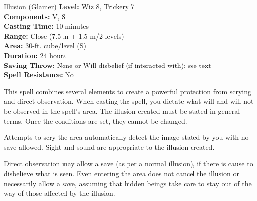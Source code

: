 {Illusion (Glamer)}
{
	\textbf{Level:}
	Wiz 8, Trickery 7\\
	\textbf{Components:}
	V, S\\
	\textbf{Casting Time:}
	10 minutes\\
	\textbf{Range:}
	Close (7.5 m + 1.5 m/2 levels)\\
	\textbf{Area:}
	30-ft. cube/level (S)\\
	\textbf{Duration:}
	24 hours\\
	\textbf{Saving Throw:}
	None or Will disbelief (if interacted with); see text\\
	\textbf{Spell Resistance:}
	No\\
}
{
	This spell combines several elements to create a powerful protection from scrying and direct observation. When casting the spell, you dictate what will and will not be observed in the spell's area. The illusion created must be stated in general terms. Once the conditions are set, they cannot be changed.

	Attempts to scry the area automatically detect the image stated by you with no save allowed. Sight and sound are appropriate to the illusion created.

	Direct observation may allow a save (as per a normal illusion), if there is cause to disbelieve what is seen. Even entering the area does not cancel the illusion or necessarily allow a save, assuming that hidden beings take care to stay out of the way of those affected by the illusion.

}
